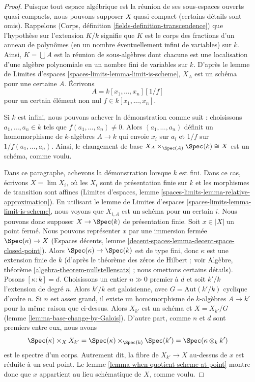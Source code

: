 \begin{proof}
Puisque tout espace algébrique est la réunion de ses sous-espaces ouverts
quasi-compacts, nous pouvons supposer $X$ quasi-compact (certains détails sont omis).
Rappelons (Corps, définition \ref{fields-definition-transcendence})
que l'hypothèse sur l'extension $K/k$ signifie que
$K$ est le corps des fractions d'un anneau de polynômes (en un nombre éventuellement infini
de variables) sur $k$. Ainsi, $K = \bigcup A$ est la réunion de sous-algèbres
dont chacune est une localisation d'une algèbre polynomiale en un nombre fini de variables sur $k$.
D'après le lemme de Limites d'espaces \ref{spaces-limits-lemma-limit-is-scheme},
$X_A$ est un schéma pour une certaine $A$. Écrivons
$$
A = k[x_1, \ldots, x_n][1/f]
$$
pour un certain élément non nul $f \in k[x_1, \ldots, x_n]$.

\medskip\noindent
Si $k$ est infini, nous pouvons achever la démonstration comme suit : choisissons
$a_1, \ldots, a_n \in k$ tels que $f(a_1, \ldots, a_n) \not = 0$.
Alors $(a_1, \ldots, a_n)$ définit un homomorphisme de $k$-algèbres $A \to k$
qui envoie $x_i$ sur $a_i$ et $1/f$ sur $1/f(a_1, \ldots, a_n)$.
Ainsi, le changement de base $X_A \times_{\Spec(A)} \Spec(k) \cong X$ est un
schéma, comme voulu.

\medskip\noindent
Dans ce paragraphe, achevons la démonstration lorsque $k$ est fini. Dans ce
cas, écrivons $X = \lim X_i$, où les $X_i$ sont de présentation finie sur $k$
et les morphismes de transition sont affines
(Limites d'espaces, lemme \ref{spaces-limits-lemma-relative-approximation}).
En utilisant le lemme de Limites d'espaces \ref{spaces-limits-lemma-limit-is-scheme},
nous voyons que $X_{i, A}$ est un schéma pour un certain $i$. Nous pouvons donc supposer
$X \to \Spec(k)$ de présentation finie. Soit $x \in |X|$ un point fermé.
Nous pouvons représenter $x$ par une immersion fermée
$\Spec(\kappa) \to X$
(Espaces décents, lemme \ref{decent-spaces-lemma-decent-space-closed-point}).
Alors $\Spec(\kappa) \to \Spec(k)$ est de type fini, donc $\kappa$
est une extension finie de $k$ (d'après le théorème des zéros de Hilbert ; voir
Algèbre, théorème \ref{algebra-theorem-nullstellensatz} ;
nous omettons certains détails). Posons $[\kappa : k] = d$. Choisissons un entier
$n \gg 0$ premier à $d$ et soit $k'/k$ l'extension
de degré $n$. Alors $k'/k$ est galoisienne, avec $G = \text{Aut}(k'/k)$
cyclique d'ordre $n$. Si $n$ est assez grand, il existe un homomorphisme de $k$-algèbres
$A \to k'$ pour la même raison que ci-dessus.
Alors $X_{k'}$ est un schéma et $X = X_{k'}/G$
(lemme \ref{lemma-base-change-by-Galois}).
D'autre part, comme $n$ et $d$ sont premiers entre eux, nous avons
$$
\Spec(\kappa) \times_{X} X_{k'} =
\Spec(\kappa) \times_{\Spec(k)} \Spec(k') =
\Spec(\kappa \otimes_k k')
$$
est le spectre d'un corps. Autrement dit, la fibre de $X_{k'} \to X$
au-dessus de $x$ est réduite à un seul point. Le
lemme \ref{lemma-when-quotient-scheme-at-point}
montre donc que $x$ appartient au lieu schématique de $X$, comme voulu.
\end{proof}

